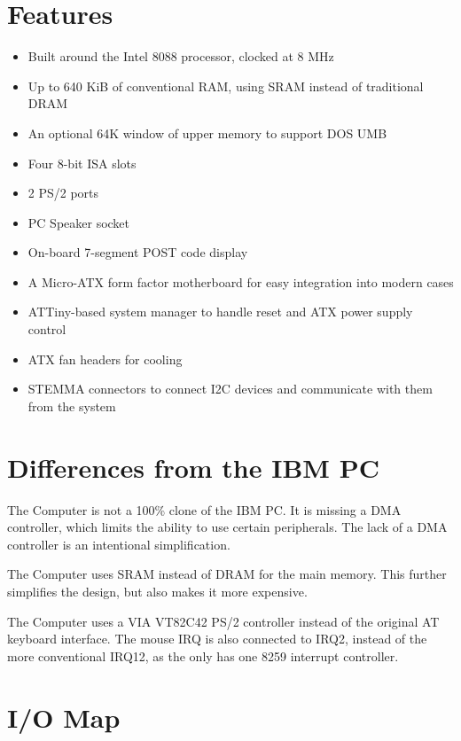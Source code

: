 \documentclass[twoside,10pt,letterpaper]{refart}
\begin{document}
\section{Features}
\begin{itemize}
    \item Built around the Intel 8088 processor, clocked at 8 MHz
    \item Up to 640 KiB of conventional RAM, using SRAM instead of traditional DRAM
    \item An optional 64K window of upper memory to support DOS UMB
    \item Four 8-bit ISA slots
    \item 2 PS/2 ports
    \item PC Speaker socket
    \item On-board 7-segment POST code display
    \item A Micro-ATX form factor motherboard for easy integration into modern cases
    \item ATTiny-based system manager to handle reset and ATX power supply control
    \item ATX fan headers for cooling
    \item STEMMA connectors to connect I2C devices and communicate with them from the system
\end{itemize}

\section{Differences from the IBM PC}
The  Computer is not a 100\% clone of the IBM PC. It is missing a
DMA controller, which limits the ability to use certain peripherals. The lack of a
DMA controller is an intentional simplification.

The  Computer uses SRAM instead of DRAM for the main memory. This
further simplifies the design, but also makes it more expensive.

The  Computer uses a VIA VT82C42 PS/2 controller instead of the original
AT keyboard interface. The mouse IRQ is also connected to IRQ2, instead of
the more conventional IRQ12, as the  only has one 8259 interrupt controller.

\newpage

\section{I/O Map}
\end{document}
